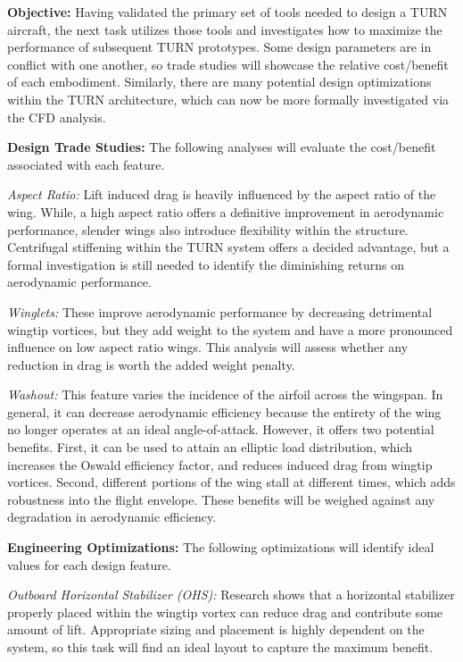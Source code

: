\documentclass[11pt]{article}
\begin{document}
{\bf Objective:}
Having validated the primary set of tools needed to design a TURN aircraft, the next task utilizes those tools and investigates how to maximize the performance of subsequent TURN prototypes.  Some design parameters are in conflict with one another, so trade studies will showcase the relative cost/benefit of each embodiment.  Similarly, there are many potential design optimizations within the TURN architecture, which can now be more formally investigated via the CFD analysis.


{\bf Design Trade Studies:}
The following analyses will evaluate the cost/benefit associated with each feature.

\emph{Aspect Ratio:}
Lift induced drag is heavily influenced by the aspect ratio of the wing.  While, a high aspect ratio offers a definitive improvement in aerodynamic performance, slender wings also introduce flexibility within the structure.  Centrifugal stiffening within the TURN system offers a decided advantage, but a formal investigation is still needed to identify the diminishing returns on aerodynamic performance.

\emph{Winglets:}
These improve aerodynamic performance by decreasing detrimental wingtip vortices, but they add weight to the system and have a more pronounced influence on low aspect ratio wings.  This analysis will assess whether any reduction in drag is worth the added weight penalty.

\emph{Washout:}
This feature varies the incidence of the airfoil across the wingspan.  In general, it can decrease aerodynamic efficiency because the entirety of the wing no longer operates at an ideal angle-of-attack.  However, it offers two potential benefits.  First, it can be used to attain an elliptic load distribution, which increases the Oswald efficiency factor, and reduces induced drag from wingtip vortices.  Second, different portions of the wing stall at different times, which adds robustness into the flight envelope.  These benefits will be weighed against any degradation in aerodynamic efficiency.


{\bf Engineering Optimizations:}
The following optimizations will identify ideal values for each design feature.

\emph{Outboard Horizontal Stabilizer (OHS):}
Research shows that a horizontal stabilizer properly placed within the wingtip vortex can reduce drag and contribute some amount of lift.  Appropriate sizing and placement is highly dependent on the system, so this task will find an ideal layout to capture the maximum benefit.
\end{document}
